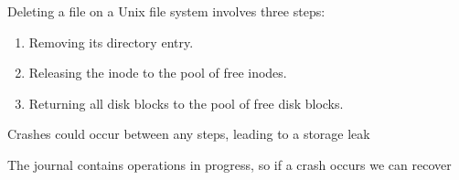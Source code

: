 \begin{slide}
  

  Deleting a file on a Unix file system involves three steps:

  \begin{enumerate}
    \item Removing its directory entry.
    \item Releasing the inode to the pool of free inodes.
    \item Returning all disk blocks to the pool of free disk blocks.
  \end{enumerate}
  \medskip

  Crashes could occur between any steps, leading to a storage leak
  \medskip

  The journal contains operations in progress, so if a crash occurs we can
  recover

\end{slide}



